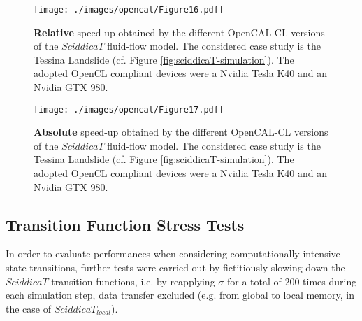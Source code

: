 \begin{figure}
	\begin{center}
		\texttt{[image: ./images/opencal/Figure16.pdf]}
		\caption[\textbf{Relative} speed-up obtained by the different OpenCAL-CL versions of the
		$SciddicaT$ fluid-flow model.]{\textbf{Relative} speed-up obtained by the different OpenCAL-CL versions of the
			$SciddicaT$ fluid-flow model. The considered case study is the Tessina
			Landslide (cf. Figure \ref{fig:sciddicaT-simulation}). The adopted
			OpenCL compliant devices were a Nvidia Tesla K40 and an Nvidia GTX
			980.}
		\label{gr:sciddicaT-CL-relative-speed-up}
	\end{center}
\end{figure}
\begin{figure}
	\begin{center}
		\texttt{[image: ./images/opencal/Figure17.pdf]}
		\caption[\textbf{Absolute} speed-up obtained by the different OpenCAL-CL versions of the
		$SciddicaT$ fluid-flow model.]{\textbf{Absolute} speed-up obtained by the different OpenCAL-CL versions of the
			$SciddicaT$ fluid-flow model. The considered case study is the Tessina
			Landslide (cf. Figure \ref{fig:sciddicaT-simulation}). The adopted
			OpenCL compliant devices were a Nvidia Tesla K40 and an Nvidia GTX
			980.}
		\label{gr:sciddicaT-CL-absolute-speed-up}
	\end{center}
\end{figure}




\subsection{Transition Function Stress Tests}    
In order to evaluate performances when considering
computationally intensive state transitions, further tests were
carried out by fictitiously slowing-down the $SciddicaT$
transition functions, i.e. by reapplying $\sigma$ for a total of
200 times during each simulation step, data transfer excluded
(e.g. from global to local memory, in the case of
$SciddicaT_{local}$).

